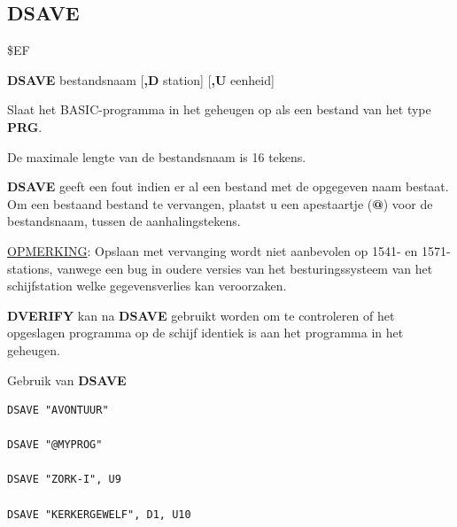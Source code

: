 \subsection{DSAVE}
\begin{description}[leftmargin=2cm,style=nextline]
\item [Token:]    \$EF

\item [Formaat:]   {\bf DSAVE} bestandsnaam [{\bf,D} station] [{\bf,U} eenheid]

\item [Gebruik:]    Slaat het BASIC-programma in het geheugen op als een bestand van het type {\bf PRG}.

                  \filenamedefinition

                  De maximale lengte van de bestandsnaam is 16 tekens.

                  {\bf DSAVE} geeft een fout indien er al een bestand met de opgegeven naam bestaat. Om een bestaand bestand te vervangen, plaatst u een apestaartje ({\bf @}) voor de bestandsnaam, tussen de aanhalingstekens.

                  \underline{OPMERKING}: Opslaan met vervanging wordt niet aanbevolen op 1541- en 1571-stations, vanwege een bug in oudere versies van het besturingssysteem van het schijfstation welke gegevensverlies kan veroorzaken.

                  \drivedefinition

                  \unitdefinition

\item [Opmerkingen:]  {\bf DVERIFY} kan na {\bf DSAVE} gebruikt worden om te controleren of het opgeslagen programma op de schijf identiek is aan het programma in het geheugen.

\item [Voorbeelden:] Gebruik van {\bf DSAVE}

\begin{tcolorbox}[colback=black,coltext=white]
\verbatimfont{\codefont}
\begin{verbatim}
DSAVE "AVONTUUR"

DSAVE "@MYPROG"

DSAVE "ZORK-I", U9

DSAVE "KERKERGEWELF", D1, U10
\end{verbatim}
\end{tcolorbox}
\end{description}

